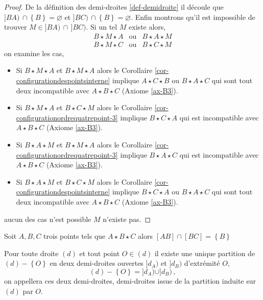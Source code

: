 \begin{thm}
\begin{proof}
        De la définition des demi-droites \ref{def-demidroite} il découle que $]BA)\,\cap \left\{B\right\}=\varnothing$ et $]BC)\,\cap \left\{B\right\}=\varnothing$. Enfin montrons qu'il est impossible de trouver $M \in ]BA)\,\cap\, ]BC)$. Si un tel $M$ existe alors,
        \begin{equation*}
            \begin{array}{ccc}
                 B\star M \star A & \text{ou} & B\star A \star M \\
                 B\star M \star C & \text{ou} & B\star C \star M
            \end{array}
        \end{equation*}
        on examine les cas,
        \begin{itemize}[$\bullet$]
            \item Si $B\star M \star A$ et $B\star M \star A$ alors le Corollaire \ref{cor-configurationdespointsinterne} implique $A \star C \star B$ ou $B \star A \star C$ qui sont tout deux incompatible avec $A\star B\star C$ (Axiome \ref{ax-B3}). 
            \item Si $B\star M \star A$ et $B\star C \star M$ alors le Corollaire \ref{cor-configurationordrequatrepoint-3} implique $B \star C \star A$ qui est incompatible avec $A\star B\star C$ (Axiome \ref{ax-B3}). 
            \item Si $B\star A \star M$ et $B\star M \star A$ alors le Corollaire \ref{cor-configurationordrequatrepoint-3} implique $B \star A \star C$ qui est incompatible avec $A\star B\star C$ (Axiome \ref{ax-B3}). 
            \item Si $B\star A \star M$ et $B\star C \star M$ alors le Corollaire \ref{cor-configurationdespointsinterne} implique $B \star C \star A$ ou $B \star A \star C$ qui sont tout deux incompatible avec $A\star B\star C$ (Axiome \ref{ax-B3}). 
        \end{itemize}
        aucun des cas n'est possible $M$ n'existe pas. 
    \end{proof}
\end{thm}
\begin{cor}
    Soit $A,B,C$ trois points tels que $A\star B\star C$ alors $[AB]\cap[BC]=\left\{B\right\}$
\end{cor}
\begin{cor}\label{cor-partitiondroite}
    Pour toute droite $(d)$ et tout point $O\in (d)$ il existe une unique partition de $(d)-\left\{O\right\}$ en deux demi-droites ouvertes $]d_A)$ et $]d_B)$ d'extrémité $O$,
    \begin{equation*}
        (d)-\left\{O\right\} = ]d_A) \cup ]d_B)\,,
    \end{equation*}
    on appellera ces deux demi-droites, demi-droites issue de la partition induite sur $(d)$ par $O$.
\end{cor}
